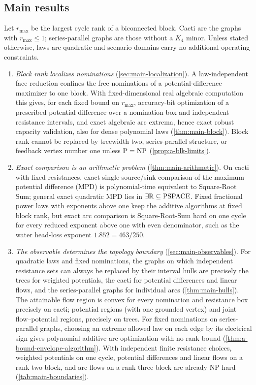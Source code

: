 \subsection{Main results}

Let $r_{\max}$ be the largest cycle rank of a biconnected block. Cacti
are the graphs with $r_{\max}\le1$; series-parallel graphs are those
without a $K_4$ minor. Unless stated otherwise, laws are quadratic and
scenario domains carry no additional operating constraints.

\begin{enumerate}
\item \emph{Block rank localizes nominations}
(\cref{sec:main-localization}). A law-independent face reduction
confines the free nominations of a potential-difference maximizer to
one block.
With fixed-dimensional real algebraic computation this gives, for each
fixed bound on $r_{\max}$, accuracy-bit optimization of a prescribed
potential difference over a nomination box and independent resistance
intervals, and exact algebraic arc extrema, hence exact robust capacity
validation, also for dense polynomial laws (\cref{thm:main-block}).
Block rank cannot be replaced by treewidth two,
series-parallel structure, or feedback vertex number one unless
$\mathrm P=\mathrm{NP}$ (\cref{prop:a-blk-limits}).

\item \emph{Exact comparison is an arithmetic problem}
(\cref{thm:main-arithmetic}). On cacti with fixed resistances, exact
single-source/sink comparison of the maximum potential difference (MPD)
is polynomial-time equivalent to Square-Root Sum; general exact
quadratic MPD lies in $\exists\mathbb{R}\subseteq\mathrm{PSPACE}$. Fixed fractional power
laws with exponents above one keep the additive algorithms at fixed
block rank, but exact arc comparison is Square-Root-Sum hard on one
cycle for every reduced exponent above one with even denominator, such
as the water head-loss exponent $1.852=463/250$.

\item \emph{The observable determines the topology boundary}
(\cref{sec:main-observables}). For quadratic laws and fixed nominations,
the graphs on which independent resistance sets can always be replaced
by their interval hulls are precisely the trees for weighted potentials, the cacti for potential
differences and linear flows, and the series-parallel graphs for
individual arcs (\cref{thm:main-hulls}). The attainable flow region is
convex for every nomination and resistance box precisely on cacti;
potential regions (with one grounded vertex) and joint flow--potential
regions, precisely on trees. For fixed nominations on series-parallel
graphs, choosing an extreme allowed law on each edge by its electrical
sign gives polynomial
additive arc optimization with no rank bound
(\cref{thm:a-bound-envelope-algorithm}). With independent finite
resistance choices, weighted potentials on one cycle, potential
differences and linear flows on a rank-two block, and arc flows on a
rank-three block are already NP-hard (\cref{tab:main-boundaries}).


\end{enumerate}
